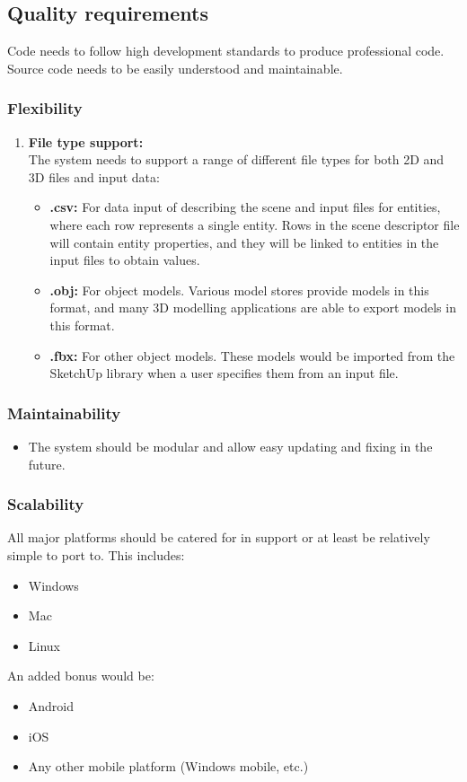\documentclass[a4paper,12pt]{article}
\begin{document}
\subsection{Quality requirements}
Code needs to follow high development standards to produce professional code. Source code needs to be easily understood and maintainable.

\subsubsection{Flexibility}
\begin{enumerate}
	\item \textbf{File type support:}\\
	The system needs to support a range of different file types for both 2D and 3D files and input data:
	\begin{itemize}
		\item \textbf{.csv:} For data input of describing the scene and input files for entities, where each row represents a single entity. Rows in the scene descriptor file will contain entity properties, and they will be linked to entities in the input files to obtain values.
		\item \textbf{.obj:} For object models. Various model stores provide models in this format, and many 3D modelling applications are able to export models in this format.
		\item \textbf{.fbx:} For other object models. These models would be imported from the SketchUp library when a user specifies them from an input file.
	\end{itemize}
\end{enumerate}


\subsubsection{Maintainability}
	\begin{itemize}
		\item The system should be modular and allow easy updating and fixing in the future.
	\end{itemize}

\subsubsection{Scalability}
All major platforms should be catered for in support or at least be relatively simple to port to. This includes:
	\begin{itemize}
		\item Windows
		\item Mac
		\item Linux		
	\end{itemize}
An added bonus would be:
	\begin{itemize}
		\item Android
		\item iOS
		\item Any other mobile platform (Windows mobile, etc.)
	\end{itemize}
	
\end{document}

